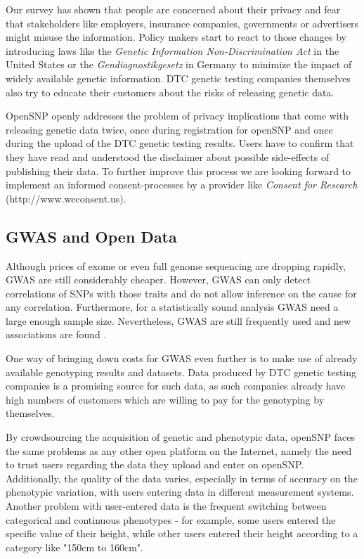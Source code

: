 \documentclass[10pt]{article}
\begin{document}
Our survey has shown that people are concerned about their privacy and fear that stakeholders like employers, insurance companies, governments 
or advertisers might misuse the information. Policy makers start to react to those changes by introducing laws like the 
\textit{Genetic Information Non-Discrimination Act} in the United States or the \emph{Gendiagnostikgesetz} in Germany to minimize the impact of
widely available genetic information. DTC genetic testing companies themselves also try to educate their customers about the risks of releasing genetic data.  

OpenSNP openly addresses the problem of privacy implications that come with releasing genetic data twice, once during registration for openSNP and once during 
the upload of the DTC genetic testing results. Users have to confirm that they have read and understood the disclaimer about possible side-effects 
of publishing their data. To further improve this process we are looking forward to implement an informed consent-processes 
by a provider like \textit{Consent for Research} (http://www.weconsent.us).

\subsection*{GWAS and Open Data}
Although prices of exome or even full genome sequencing are dropping rapidly, GWAS are still considerably cheaper. However, GWAS can only detect correlations of SNPs with those traits and do not allow 
inference on the cause for any correlation. Furthermore, for a statistically sound analysis GWAS need a large enough sample size. Nevertheless, GWAS are still frequently used and new associations are found \cite{10.1371.journal.pone.0031470,10.1371.journal.pone.0030309,10.1371.journal.pone.0029848}. 

One way of bringing down costs for GWAS even further is to make use of already available genotyping results and datasets. 
Data produced by DTC genetic testing companies is a promising source for such data, as such companies already have high 
numbers of customers which are willing to pay for the genotyping by themselves.

By crowdsourcing the acquisition of genetic and phenotypic data, openSNP faces the same problems as any other 
open platform on the Internet, namely the need to trust users regarding the data they upload and enter on openSNP. 
Additionally, the quality of the data varies, especially in terms of accuracy on the phenotypic variation, 
with users entering data in different measurement systems. Another problem with user-entered data is the frequent switching between categorical and continuous phenotypes - for example, some users entered the specific value of their height, while other users entered their height according to a category like "150cm to 160cm". 
\end{document}

